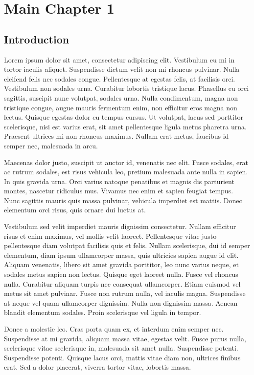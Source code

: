 \chapter{Main Chapter 1}
\label{chap:Main_1}
\section{Introduction}
\label{sec:Main_1_Intro}

Lorem ipsum dolor sit amet, consectetur adipiscing elit. Vestibulum eu mi in tortor iaculis aliquet. Suspendisse dictum velit non mi rhoncus pulvinar. Nulla eleifend felis nec sodales congue. Pellentesque at egestas felis, at facilisis orci. Vestibulum non sodales urna. Curabitur lobortis tristique lacus. Phasellus eu orci sagittis, suscipit nunc volutpat, sodales urna. Nulla condimentum, magna non tristique congue, augue mauris fermentum enim, non efficitur eros magna non lectus. Quisque egestas dolor eu tempus cursus. Ut volutpat, lacus sed porttitor scelerisque, nisi est varius erat, sit amet pellentesque ligula metus pharetra urna. Praesent ultrices mi non rhoncus maximus. Nullam erat metus, faucibus id semper nec, malesuada in arcu.

Maecenas dolor justo, suscipit ut auctor id, venenatis nec elit. Fusce sodales, erat ac rutrum sodales, est risus vehicula leo, pretium malesuada ante nulla in sapien. In quis gravida urna. Orci varius natoque penatibus et magnis dis parturient montes, nascetur ridiculus mus. Vivamus nec enim et sapien feugiat tempus. Nunc sagittis mauris quis massa pulvinar, vehicula imperdiet est mattis. Donec elementum orci risus, quis ornare dui luctus at.

Vestibulum sed velit imperdiet mauris dignissim consectetur. Nullam efficitur risus et enim maximus, vel mollis velit laoreet. Pellentesque vitae justo pellentesque diam volutpat facilisis quis et felis. Nullam scelerisque, dui id semper elementum, diam ipsum ullamcorper massa, quis ultricies sapien augue id elit. Aliquam venenatis, libero sit amet gravida porttitor, leo nunc varius neque, et sodales metus sapien non lectus. Quisque eget laoreet nulla. Fusce vel rhoncus nulla. Curabitur aliquam turpis nec consequat ullamcorper. Etiam euismod vel metus sit amet pulvinar. Fusce non rutrum nulla, vel iaculis magna. Suspendisse at neque vel quam ullamcorper dignissim. Nulla non dignissim massa. Aenean blandit elementum sodales. Proin scelerisque vel ligula in tempor.

Donec a molestie leo. Cras porta quam ex, et interdum enim semper nec. Suspendisse at mi gravida, aliquam massa vitae, egestas velit. Fusce purus nulla, scelerisque vitae scelerisque in, malesuada sit amet nulla. Suspendisse potenti. Suspendisse potenti. Quisque lacus orci, mattis vitae diam non, ultrices finibus erat. Sed a dolor placerat, viverra tortor vitae, lobortis massa.

